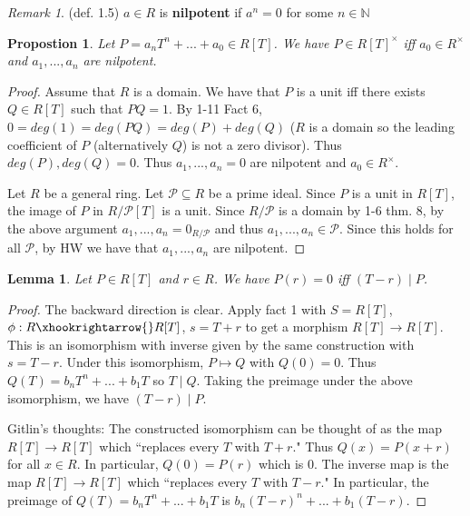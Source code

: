 \documentclass{amsart}
\newcommand{\NN}{\mathbb{N}}
\newtheorem{lemma}[thm]{Lemma}
\newtheorem{prop}[thm]{Propostion}
\theoremstyle{definition}
\theoremstyle{remark}
\newtheorem*{rmk}{Remark}
\begin{document}
\begin{rmk} (def. 1.5)
$a \in R$ is \textbf{nilpotent} if $a^n = 0$ for some $n \in \NN$
\end{rmk}

\begin{prop}
Let $P = a_nT^n + ... + a_0 \in R[T]$.  We have $P \in R[T]^\times$ iff $a_0 \in R^\times$ and $a_1,...,a_n$ are nilpotent.
\end{prop}

\begin{proof} \hspace{0.5cm}

Assume that $R$ is a domain.  We have that $P$ is a unit iff there exists $Q \in R[T]$ such that $PQ = 1$.  By 1-11 Fact 6, $0 = deg(1) = deg(PQ) = deg(P) + deg(Q)$ ($R$ is a domain so the leading coefficient of $P$ (alternatively $Q$) is not a zero divisor).  Thus $deg(P),deg(Q) = 0$.  Thus $a_1,...,a_n = 0$ are nilpotent and $a_0 \in R^\times$.

Let $R$ be a general ring.  Let $\mathcal{P} \subseteq R$ be a prime ideal.  Since $P$ is a unit in $R[T]$, the image of $P$ in $R / \mathcal{P}[T]$ is a unit.  Since $R/\mathcal{P}$ is a domain by 1-6 thm. 8, by the above argument $a_1,...,a_n = 0_{R/\mathcal{P}}$ and thus $a_1,...,a_n \in \mathcal{P}$.  Since this holds for all $\mathcal{P}$, by HW we have that $a_1,...,a_n$ are nilpotent.

\end{proof}

\begin{lemma}
Let $P \in R[T]$ and $r \in R$.  We have $P(r) = 0$ iff $(T-r) \mid P$.
\end{lemma}

\begin{proof}

The backward direction is clear.  Apply fact 1 with $S = R[T]$, $\phi : R \xhookrightarrow{} R[T]$, $s = T+r$ to get a morphism $R[T] \rightarrow R[T]$.  This is an isomorphism with inverse given by the same construction with $s = T-r$.  Under this isomorphism, $P \mapsto Q$ with $Q(0) = 0$.  Thus $Q(T) = b_nT^n + ... + b_1T$ so $T \mid Q$.  Taking the preimage under the above isomorphism, we have $(T-r) \mid P$.

Gitlin's thoughts:  The constructed isomorphism can be thought of as the map $R[T] \rightarrow R[T]$ which ``replaces every $T$ with $T+r$."  Thus $Q(x) = P(x+r)$ for all $x \in R$.  In particular, $Q(0) = P(r)$ which is $0$.  The inverse map is the map $R[T] \rightarrow R[T]$ which ``replaces every $T$ with $T-r$."  In particular, the preimage of $Q(T) = b_nT^n + ... + b_1T$ is $b_n(T-r)^n + ... + b_1(T-r)$.

\end{proof}
\end{document}
